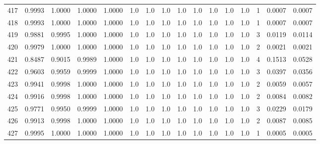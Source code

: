 \begin{tabular}{lrrrrrrrrrrrrrrr}
417 &      0.9993 &  1.0000 &  1.0000 &  1.0000 &     1.0 &     1.0 &     1.0 &     1.0 &     1.0 &     1.0 &      1.0 &        1.0 &      1 &                    0.0007 &                     0.0007 \\
418 &      0.9993 &  1.0000 &  1.0000 &  1.0000 &     1.0 &     1.0 &     1.0 &     1.0 &     1.0 &     1.0 &      1.0 &        1.0 &      1 &                    0.0007 &                     0.0007 \\
419 &      0.9881 &  0.9995 &  1.0000 &  1.0000 &     1.0 &     1.0 &     1.0 &     1.0 &     1.0 &     1.0 &      1.0 &        1.0 &      3 &                    0.0119 &                     0.0114 \\
420 &      0.9979 &  1.0000 &  1.0000 &  1.0000 &     1.0 &     1.0 &     1.0 &     1.0 &     1.0 &     1.0 &      1.0 &        1.0 &      2 &                    0.0021 &                     0.0021 \\
421 &      0.8487 &  0.9015 &  0.9989 &  1.0000 &     1.0 &     1.0 &     1.0 &     1.0 &     1.0 &     1.0 &      1.0 &        1.0 &      4 &                    0.1513 &                     0.0528 \\
422 &      0.9603 &  0.9959 &  0.9999 &  1.0000 &     1.0 &     1.0 &     1.0 &     1.0 &     1.0 &     1.0 &      1.0 &        1.0 &      3 &                    0.0397 &                     0.0356 \\
423 &      0.9941 &  0.9998 &  1.0000 &  1.0000 &     1.0 &     1.0 &     1.0 &     1.0 &     1.0 &     1.0 &      1.0 &        1.0 &      2 &                    0.0059 &                     0.0057 \\
424 &      0.9916 &  0.9998 &  1.0000 &  1.0000 &     1.0 &     1.0 &     1.0 &     1.0 &     1.0 &     1.0 &      1.0 &        1.0 &      2 &                    0.0084 &                     0.0082 \\
425 &      0.9771 &  0.9950 &  0.9999 &  1.0000 &     1.0 &     1.0 &     1.0 &     1.0 &     1.0 &     1.0 &      1.0 &        1.0 &      3 &                    0.0229 &                     0.0179 \\
426 &      0.9913 &  0.9998 &  1.0000 &  1.0000 &     1.0 &     1.0 &     1.0 &     1.0 &     1.0 &     1.0 &      1.0 &        1.0 &      2 &                    0.0087 &                     0.0085 \\
427 &      0.9995 &  1.0000 &  1.0000 &  1.0000 &     1.0 &     1.0 &     1.0 &     1.0 &     1.0 &     1.0 &      1.0 &        1.0 &      1 &                    0.0005 &                     0.0005 \\

\end{tabular}
